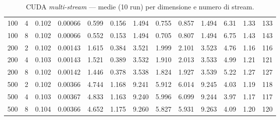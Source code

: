 \begin{table}[h]
{\begin{tabular}{r r
					r r r r r r
					r r r r r}
						100                 & 4             & 0.102          & 0.00066      & 0.599           & 0.156             & 1.494        & 0.755            & 0.857          & 1.494         & 6.31          & 1.33             & 133               \\
						100                 & 8             & 0.102          & 0.00066      & 0.552           & 0.153             & 1.494        & 0.705            & 0.807          & 1.494         & 6.75          & 1.43             & 143               \\
						\midrule
						200                 & 2             & 0.102          & 0.00143      & 1.615           & 0.384             & 3.521        & 1.999            & 2.101          & 3.523         & 4.76          & 1.16             & 116               \\
						200                 & 4             & 0.103          & 0.00143      & 1.521           & 0.389             & 3.532        & 1.910            & 2.013          & 3.533         & 4.99          & 1.21             & 121               \\
						200                 & 8             & 0.102          & 0.00142      & 1.446           & 0.378             & 3.538        & 1.824            & 1.927          & 3.539         & 5.22          & 1.27             & 127               \\
						\midrule
						500                 & 2             & 0.102          & 0.00366      & 4.744           & 1.168             & 9.241        & 5.912            & 6.014          & 9.245         & 4.03          & 1.19             & 118               \\
						500                 & 4             & 0.103          & 0.00367      & 4.833           & 1.163             & 9.240        & 5.996            & 6.099          & 9.244         & 3.97          & 1.17             & 117               \\
						500                 & 8             & 0.104          & 0.00366      & 4.652           & 1.175             & 9.260        & 5.827            & 5.931          & 9.263         & 4.09          & 1.20             & 120               \\
						\bottomrule
					\end{tabular}}
				\caption{CUDA \emph{multi-stream} — medie (10 run) per dimensione e numero di stream.}
				\label{tab:cuda-ms-times}
			\end{table}
			
